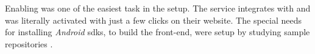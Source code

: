 Enabling  was one of the easiest task in the setup.
The  service integrates with  and was literally activated with just a few clicks on their website.
The special needs for installing \textit{Android} \glspl{sdk}, to build the front-end, were setup by studying  sample repositories \citep{testing:nativescript:sample}.
